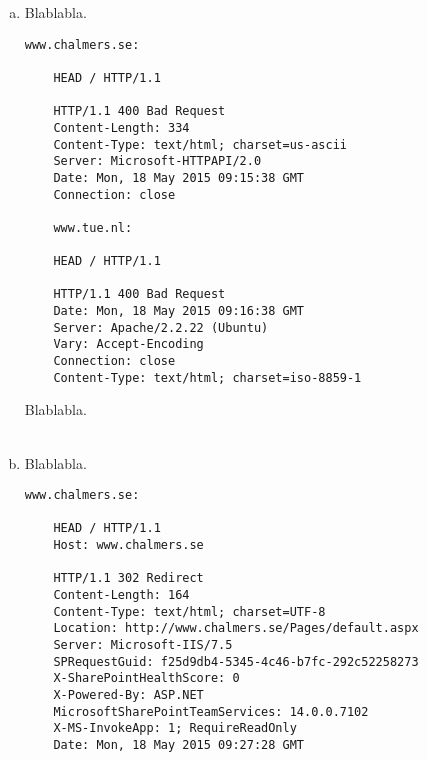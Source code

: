 \documentclass[a4paper,9pt,fleqn]{article}
\begin{document}
\begin{enumerate}[{Task} 1]
\begin{enumerate}[a)]
RequiredReadOnly means that it opens in Read-Only mode.

\begin{lstlisting}
	www.tue.nl:

	HEAD / HTTP/1.0

	HTTP/1.1 301 Moved Permanently
	Date: Mon, 18 May 2015 08:24:17 GMT
	Server: Apache/2.2.22 (Ubuntu)
	X-Powered-By: PHP/5.3.10-1ubuntu3.18
	Location: http://www.tue.nl/
	Vary: Accept-Encoding
	Content-Type: text/html


	Connection closed by foreign host.


	{\outp www.tue.nl} is using the web server type {\outp Apache/2.2.22 (Ubuntu)}.
\end{lstlisting}

301 Move Permanently means that the resource we are requesting has been redirected
to a new URL. The new URL is specified in the Location field. In this case www.tue.nl
is redirecting to http://www.tue.nl/. The Vary field specifies which fields of the
request header to take into account when trying to find the right object in the cache.
\\
\\
\item 
Blablabla.

\begin{lstlisting}
www.chalmers.se:

	HEAD / HTTP/1.1

	HTTP/1.1 400 Bad Request
	Content-Length: 334
	Content-Type: text/html; charset=us-ascii
	Server: Microsoft-HTTPAPI/2.0
	Date: Mon, 18 May 2015 09:15:38 GMT
	Connection: close

	www.tue.nl:

	HEAD / HTTP/1.1

	HTTP/1.1 400 Bad Request
	Date: Mon, 18 May 2015 09:16:38 GMT
	Server: Apache/2.2.22 (Ubuntu)
	Vary: Accept-Encoding
	Connection: close
	Content-Type: text/html; charset=iso-8859-1
\end{lstlisting}
Blablabla.
\\
\\
\item 
Blablabla.

\begin{lstlisting}
www.chalmers.se:

	HEAD / HTTP/1.1
	Host: www.chalmers.se

	HTTP/1.1 302 Redirect
	Content-Length: 164
	Content-Type: text/html; charset=UTF-8
	Location: http://www.chalmers.se/Pages/default.aspx
	Server: Microsoft-IIS/7.5
	SPRequestGuid: f25d9db4-5345-4c46-b7fc-292c52258273
	X-SharePointHealthScore: 0
	X-Powered-By: ASP.NET
	MicrosoftSharePointTeamServices: 14.0.0.7102
	X-MS-InvokeApp: 1; RequireReadOnly
	Date: Mon, 18 May 2015 09:27:28 GMT


\end{lstlisting}
\end{enumerate}
\end{enumerate}
\end{document}
